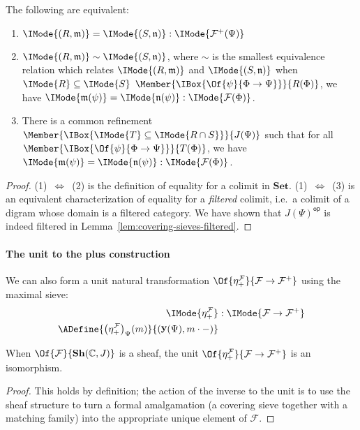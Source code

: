 \documentclass{article}
\newcommand\Sets{\mathbf{Set}}
\newcommand\OpCat[1]{{{#1}^{\mathsf{op}}}}
\DeclareMathOperator\OpYoneda{\mathbf{y}}
\newcommand\Yoneda[1]{\OpYoneda({#1})}
\newcommand\Sh[1]{\mathbf{Sh} (#1)}
\newcommand\IsSubsetEq[2]{\IMode{#1}\subseteq\IMode{#2}}
\newcommand\AOf[2]{\IMode{#1}&:\IMode{#2}}
\newcommand\Plus[1]{{#1}^+}
\newcommand\IsEqOf[3]{\IMode{#1}=\IMode{#2}:\IMode{#3}}
\newcommand\Sim[2]{\IMode{#1}\sim\IMode{#2}}
\begin{document}
\begin{lem}[Equality in $\Plus{\mathcal{F}}$]\label{lem:plus-construction-equality}
  The following are equivalent:
  \begin{enumerate}
  \item $\IsEqOf{(R,\mathfrak{m})}{(S,\mathfrak{n})}{\Plus{\mathcal{F}}(\Psi)}$
  \item $\Sim{(R,\mathfrak{m})}{(S,\mathfrak{n})}$, where
    $\sim$ is the smallest equivalence relation which relates
    $\IMode{(R,\mathfrak{m})}$ and $\IMode{(S,\mathfrak{n})}$ when $\IsSubsetEq{R}{S}$
    $\Member{\IBox{\Of{\psi}{\Phi\to\Psi}}}{R(\Phi)}$, we have
    $\IsEqOf{\mathfrak{m}(\psi)}{\mathfrak{n}(\psi)}{\mathcal{F}(\Phi)}$.
  \item There is a common refinement
    $\Member{\IBox{\IsSubsetEq{T}{R\cap S}}}{J(\Psi)}$ such that for
    all $\Member{\IBox{\Of{\psi}{\Phi\to\Psi}}}{T(\Phi)}$, we have
    $\IsEqOf{\mathfrak{m}(\psi)}{\mathfrak{n}(\psi)}{\mathcal{F}(\Phi)}$.
  \end{enumerate}
\end{lem}
\begin{proof}
  (1)~$\Leftrightarrow$~(2) is the definition of equality for a colimit in
  $\Sets$.
  (1)~$\Leftrightarrow$~(3) is an equivalent characterization of
  equality for a \emph{filtered} colimit, i.e.\ a colimit of a digram
  whose domain is a filtered category. We have shown that
  $\OpCat{J(\Psi)}$ is indeed filtered in
  Lemma~\ref{lem:covering-sieves-filtered}.
\end{proof}

\paragraph{The unit to the plus construction}
We can also form a unit natural transformation
$\Of{\eta_+^{\mathcal{F}}}{\mathcal{F}\to\Plus{\mathcal{F}}}$ using
the maximal sieve:
\begin{align*}
  \AOf{\eta_+^{\mathcal{F}}}{\mathcal{F}\to\Plus{\mathcal{F}}}
  \\
  \ADefine{
    {\left(\eta_+^{\mathcal{F}}\right)}_\Psi(m)
  }{
    (\Yoneda{\Psi},m\cdot-)
  }
\end{align*}

\newcommand\Glue[1]{\mathsf{glue}_{#1}}

\begin{lem}\label{lem:executing-formal-amalgamations}
  When $\Of{\mathcal{F}}{\Sh{\mathbb{C},J}}$ is a sheaf, the unit
  $\Of{\eta_+^{\mathcal{F}}}{\mathcal{F}\to\Plus{\mathcal{F}}}$ is an
  isomorphism.
\end{lem}
\begin{proof}
  This holds by definition; the action of the inverse to the unit is
  to use the sheaf structure to turn a formal amalgamation (a covering
  sieve together with a matching family) into the appropriate unique
  element of $\mathcal{F}$.
\end{proof}
\end{document}
